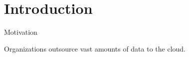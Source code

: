 \section{Introduction}

	\begin{frame}{Motivation}

		Organizations outsource vast amounts of data to the cloud.


	\end{frame}
